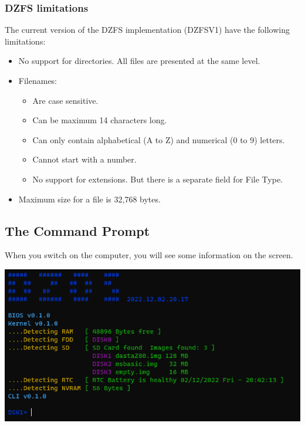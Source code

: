 \documentclass[a4paper,11pt]{article}
\begin{document}
    \subsubsection{DZFS limitations}
    The current version of the DZFS implementation (DZFSV1) have the following
    limitations:

    \begin{itemize}
        \item No support for directories. All files are presented at the same
        level.
        \item Filenames:
        \begin{itemize}
            \item Are case sensitive.
            \item Can be maximum 14 characters long.
            \item Can only contain alphabetical (A to Z) and numerical (0 to 9)
            letters.
            \item Cannot start with a number.
            \item No support for extensions. But there is a separate field for
            File Type.
        \end{itemize}
        \item Maximum size for a file is 32,768 bytes.
    \end{itemize}
        
    \pagebreak
    \subsection{The Command Prompt}
    When you switch on the computer, you will see some information on the
    screen.

    \includegraphics[scale=0.7]{dzOS.png}
\end{document}
